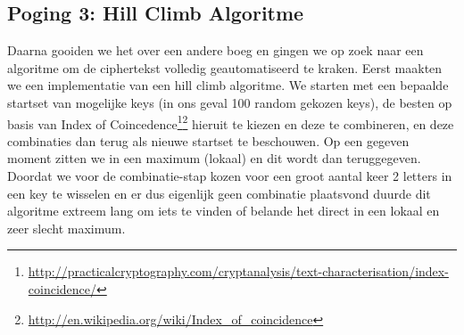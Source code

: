 \subsection{Poging 3: Hill Climb Algoritme}
Daarna gooiden we het over een andere boeg en gingen we op zoek naar een algoritme om de ciphertekst volledig geautomatiseerd te kraken. Eerst maakten we een implementatie van een hill climb algoritme. We starten met een bepaalde startset van mogelijke keys (in ons geval 100 random gekozen keys), de besten op basis van Index of Coincedence\footnote{\url{http://practicalcryptography.com/cryptanalysis/text-characterisation/index-coincidence/}}\footnote{\url{http://en.wikipedia.org/wiki/Index_of_coincidence}} hieruit te kiezen en deze te combineren, en deze combinaties dan terug als nieuwe startset te beschouwen. Op een gegeven moment zitten we in een maximum (lokaal) en dit wordt dan teruggegeven. Doordat we voor de combinatie-stap kozen voor een groot aantal keer 2 letters in een key te wisselen en er dus eigenlijk geen combinatie plaatsvond duurde dit algoritme extreem lang om iets te vinden of belande het direct in een lokaal en zeer slecht maximum.

